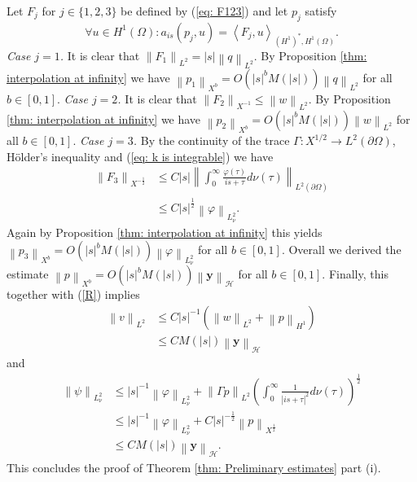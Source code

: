 \documentclass{amsart}
\newcommand{\abs}[1]{\left|#1\right|}
\newcommand{\norm}[1]{\left\| #1 \right\|}
\newcommand{\dual}[2]{\left\langle #1 , #2\right\rangle}
\newcommand{\ynice}{\mathbf{y}}
\newcommand{\Ho}{\mathcal{H}}
\begin{document}
Let $F_j$ for $j\in\{1,2,3\}$ be defined by (\ref{eq: F123}) and let $p_j$ satisfy
\begin{equation}\nonumber
 \forall u\in H^1(\Omega): a_{is}(p_j, u) = \dual{F_j}{u}_{(H^1)^*,H^1(\Omega)}.
\end{equation}
\emph{Case $j=1$.} It is clear that $\norm{F_1}_{L^2}=\abs{s}\norm{q}_{L^2}$. By Proposition \ref{thm: interpolation at infinity} we have $\norm{p_1}_{X^b}=O(\abs{s}^bM(\abs{s}))\norm{q}_{L^2}$ for all $b\in[0,1]$.
\emph{Case $j=2$.} It is clear that $\norm{F_2}_{X^{-1}}\leq\norm{w}_{L^2}$. By Proposition \ref{thm: interpolation at infinity} we have $\norm{p_2}_{X^b}=O(\abs{s}^bM(\abs{s}))\norm{w}_{L^2}$ for all $b\in[0,1]$.
\emph{Case $j=3$.} By the continuity of the trace $\Gamma:X^{1/2}\rightarrow L^2(\partial\Omega)$, H\"older's inequality and (\ref{eq: k is integrable}) we have
\begin{align*}
 \norm{F_3}_{X^{-\frac{1}{2}}} &\leq C \abs{s} \norm{\int_0^{\infty} \frac{\varphi(\tau)}{is+\tau} d\nu(\tau)}_{L^2(\partial\Omega)} \\
 &\leq C \abs{s}^{\frac{1}{2}} \norm{\varphi}_{L_{\nu}^2}.
\end{align*}
Again by Proposition \ref{thm: interpolation at infinity} this yields $\norm{p_3}_{X^b}=O(\abs{s}^bM(\abs{s}))\norm{\varphi}_{L_{\nu}^2}$ for all $b\in[0,1]$. Overall we derived the estimate $\norm{p}_{X^b}=O(\abs{s}^b M(\abs{s})) \norm{\ynice}_{\Ho}$ for all $b\in[0,1]$. Finally, this together with (\ref{R}) implies
\begin{align*}
 \norm{v}_{L^2} &\leq C\abs{s}^{-1}(\norm{w}_{L^2} + \norm{p}_{H^1}) \\
 &\leq CM(\abs{s})\norm{\ynice}_{\Ho}
\end{align*}
and
\begin{align*}
 \norm{\psi}_{L_{\nu}^2} &\leq \abs{s}^{-1}\norm{\varphi}_{L_{\nu}^2} 
   + \norm{\Gamma p}_{L^2}\left(\int_0^{\infty}\frac{1}{\abs{is+\tau}^2} d\nu(\tau)\right)^{\frac{1}{2}} \\
 &\leq \abs{s}^{-1}\norm{\varphi}_{L_{\nu}^2} + C\abs{s}^{-\frac{1}{2}}\norm{p}_{X^{\frac{1}{2}}} \\
 &\leq CM(\abs{s})\norm{\ynice}_{\Ho}.
\end{align*}
This concludes the proof of Theorem \ref{thm: Preliminary estimates} part (i).
\end{document}
